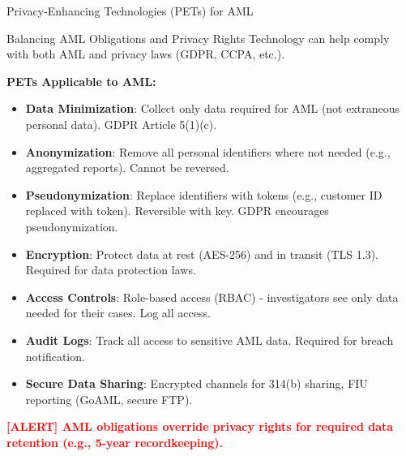 \documentclass[11pt,a4paper]{beamer}
\newcommand{\redflag}[1]{\textcolor{red}{\textbf{[ALERT] #1}}}
\begin{document}
\begin{frame}{Privacy-Enhancing Technologies (PETs) for AML}
	\begin{block}{Balancing AML Obligations and Privacy Rights}
		Technology can help comply with both AML and privacy laws (GDPR, CCPA, etc.).
	\end{block}
	\textbf{PETs Applicable to AML:}
	\begin{itemize}
		\item \textbf{Data Minimization}: Collect only data required for AML (not extraneous personal data). GDPR Article 5(1)(c).
		\item \textbf{Anonymization}: Remove all personal identifiers where not needed (e.g., aggregated reports). Cannot be reversed.
		\item \textbf{Pseudonymization}: Replace identifiers with tokens (e.g., customer ID replaced with token). Reversible with key. GDPR encourages pseudonymization.
		\item \textbf{Encryption}: Protect data at rest (AES-256) and in transit (TLS 1.3). Required for data protection laws.
		\item \textbf{Access Controls}: Role-based access (RBAC) - investigators see only data needed for their cases. Log all access.
		\item \textbf{Audit Logs}: Track all access to sensitive AML data. Required for breach notification.
		\item \textbf{Secure Data Sharing}: Encrypted channels for 314(b) sharing, FIU reporting (GoAML, secure FTP).
	\end{itemize}
	\redflag{AML obligations override privacy rights for required data retention (e.g., 5-year recordkeeping).}
\end{frame}
\end{document}
